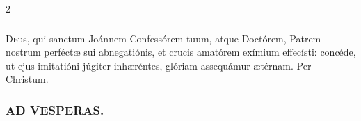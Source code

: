 \documentclass[9pt,twoside]{extarticle}
\begin{document}
\begin{multicols}{2}
\subsubsection*{\center{}}
\lettrine{D}eus, qui sanctum Joánnem Confessórem tuum, atque Doctórem, Patrem nostrum perféctæ sui abnegatiónis, et crucis amatórem exímium effecísti: concéde, ut ejus imitatióni júgiter inhæréntes, glóriam assequámur ætérnam. Per Christum.

\subsubsection*{\center \textsc{AD VESPERAS.}}
\begin{tightlist}{}
\item {}
\end{tightlist}

\end{multicols}
\end{document}
